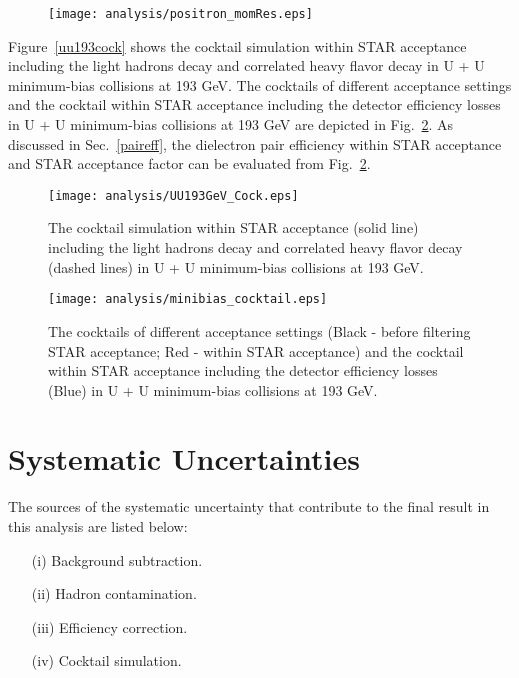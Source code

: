 \begin{figure}[htbp]
\centering
\texttt{[image: analysis/positron\_momRes.eps]}
 \label{ptres}
\end{figure}

Figure~\ref{uu193cock} shows the cocktail simulation within STAR acceptance including the light hadrons decay and correlated heavy flavor decay in U + U minimum-bias collisions at 193 GeV. The cocktails of different acceptance settings and the cocktail within STAR acceptance including the detector efficiency losses in U + U minimum-bias collisions at 193 GeV are depicted in Fig.~\ref{cocktails}. As discussed in Sec.~\ref{paireff}, the dielectron pair efficiency within STAR acceptance and STAR acceptance factor can be evaluated from Fig.~\ref{cocktails}.
\begin{figure}[htbp]
\begin{minipage}[htbp]{0.48\linewidth}
\centering
\texttt{[image: analysis/UU193GeV\_Cock.eps]}
\caption{The cocktail simulation within STAR acceptance (solid line) including the light hadrons decay and correlated heavy flavor decay (dashed lines) in U + U minimum-bias collisions at 193 GeV.\label{uu193cock}}
\end{minipage}
\hfill
\begin{minipage}[htbp]{0.48\linewidth}
\centering
\texttt{[image: analysis/minibias\_cocktail.eps]} 
\caption{The cocktails of different acceptance settings (Black - before filtering STAR acceptance; Red - within STAR acceptance) and the cocktail within STAR acceptance including the detector efficiency losses (Blue) in U + U minimum-bias collisions at 193 GeV.\label{cocktails}}
\end{minipage}
\end{figure}

\section{Systematic Uncertainties}
\label{sysUncertainty}

The sources of the systematic uncertainty that contribute to the final result in this analysis are listed below:
\begin{itemize}
\item[(i)] Background subtraction.
\item[(ii)] Hadron contamination. 
\item[(iii)] Efficiency correction.
\item[(iv)] Cocktail simulation.
\end{itemize} 

